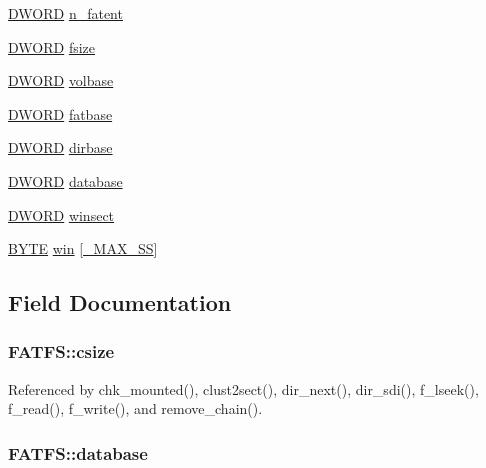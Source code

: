 \begin{DoxyCompactItemize}
\item 
\hyperlink{integer_8h_ad342ac907eb044443153a22f964bf0af}{D\-W\-O\-R\-D} \hyperlink{structFATFS_a8da50eeba6469bc20d60ca0cf9a1307c}{n\-\_\-fatent}
\item 
\hyperlink{integer_8h_ad342ac907eb044443153a22f964bf0af}{D\-W\-O\-R\-D} \hyperlink{structFATFS_a53e9560659f14e66f306c2c444198bf3}{fsize}
\item 
\hyperlink{integer_8h_ad342ac907eb044443153a22f964bf0af}{D\-W\-O\-R\-D} \hyperlink{structFATFS_a8f0ca578755749d204f59dc83f1a7649}{volbase}
\item 
\hyperlink{integer_8h_ad342ac907eb044443153a22f964bf0af}{D\-W\-O\-R\-D} \hyperlink{structFATFS_a848fba02c4aabe02ef2984e578f33d64}{fatbase}
\item 
\hyperlink{integer_8h_ad342ac907eb044443153a22f964bf0af}{D\-W\-O\-R\-D} \hyperlink{structFATFS_a3f72fd998dbcce4652a85a81fe944bc4}{dirbase}
\item 
\hyperlink{integer_8h_ad342ac907eb044443153a22f964bf0af}{D\-W\-O\-R\-D} \hyperlink{structFATFS_a5b6c0bc2e9fd2ae8ef714210a74a2d5d}{database}
\item 
\hyperlink{integer_8h_ad342ac907eb044443153a22f964bf0af}{D\-W\-O\-R\-D} \hyperlink{structFATFS_ac60e69c00e6bf7c25febfbac4dc1476b}{winsect}
\item 
\hyperlink{integer_8h_a4ae1dab0fb4b072a66584546209e7d58}{B\-Y\-T\-E} \hyperlink{structFATFS_a7cc35a593465e727ab87723c14610644}{win} \mbox{[}\hyperlink{ffconf_8h_ac271b697378912f17132cb9c7d0de024}{\-\_\-\-M\-A\-X\-\_\-\-S\-S}\mbox{]}
\end{DoxyCompactItemize}


\subsection{Field Documentation}
\hypertarget{structFATFS_a504a1175f6dcc9a854b9da94463bd108}{
\subsubsection[{csize}]{ F\-A\-T\-F\-S\-::csize}}\label{structFATFS_a504a1175f6dcc9a854b9da94463bd108}


Referenced by chk\-\_\-mounted(), clust2sect(), dir\-\_\-next(), dir\-\_\-sdi(), f\-\_\-lseek(), f\-\_\-read(), f\-\_\-write(), and remove\-\_\-chain().

\hypertarget{structFATFS_a5b6c0bc2e9fd2ae8ef714210a74a2d5d}{
\subsubsection[{database}]{ F\-A\-T\-F\-S\-::database}}\label{structFATFS_a5b6c0bc2e9fd2ae8ef714210a74a2d5d}


